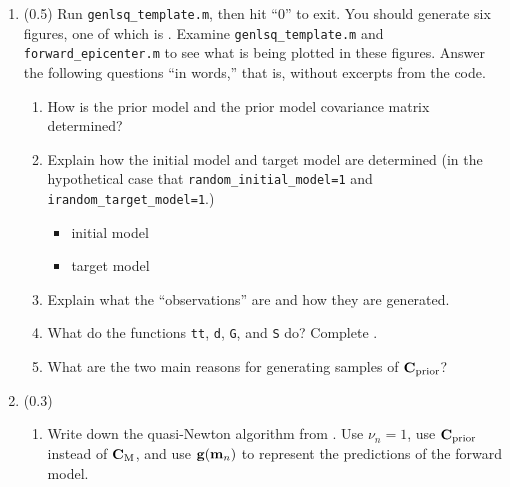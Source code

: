 \documentclass[11pt,titlepage,fleqn]{article}
\begin{document}
\clearpage\pagebreak
\begin{enumerate}
\item (0.5)
Run \verb+genlsq_template.m+, then hit ``0'' to exit. You should generate six figures, one of which is . Examine \verb+genlsq_template.m+ and \verb+forward_epicenter.m+ to see what is being plotted in these figures. Answer the following questions ``in words,'' that is, without excerpts from the code.

\begin{enumerate}
\item How is the prior model and the prior model covariance matrix determined?

\vspace{1cm}

\item Explain how the initial model and target model are determined (in the hypothetical case that \verb+random_initial_model=1+ and \verb+irandom_target_model=1+.)

\begin{itemize}
\item initial model
\item target model
\end{itemize}

\item Explain what the ``observations'' are and how they are generated.

\vspace{1cm}

\item What do the functions \verb+tt+, \verb+d+, \verb+G+, and \verb+S+ do? Complete .

\item What are the two main reasons for generating samples of $\mbox{${\bf C}$}_{\rm prior}$?

\vspace{1cm}

\end{enumerate}


\item (0.3) 

\begin{enumerate}
\item Write down the quasi-Newton algorithm from \citet[][Eq.~6.319]{Tarantola2005}. Use $\nu_n = 1$, use $\mbox{${\bf C}$}_{\rm prior}$ instead of $\mbox{${\bf C}$}_{\rm M}$, and use $\mbox{${\bf g}$}(\mbox{${\bf m}$}_n)$ to represent the predictions of the forward model.


\end{enumerate}
\end{enumerate}
\end{document}
